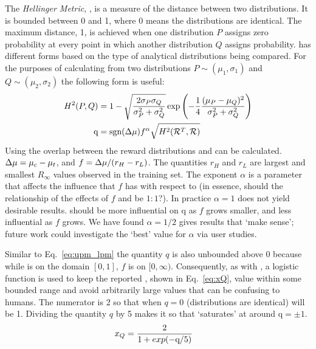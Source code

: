 The \emph{Hellinger Metric}, \hell{},  is a measure of the distance between two distributions. It is bounded between 0 and 1, where 0 means the distributions are identical. The maximum distance, 1, is achieved when one distribution $P$ assigns zero probability at every point in which another distribution $Q$ assigns probability. \hell{} has different forms based on the type of analytical distributions being compared. For the purposes of calculating \xQ{} from two distributions $P \sim (\mu_1,\sigma_1)$ and $Q\sim(\mu_2,\sigma_2)$ the following form is useful:
\begin{align}
    \hellmet &= 1-\sqrt{\frac{2\sigma_P\sigma_Q}{\sigma_P^2+\sigma_Q^2}}\exp{\left(-\frac{1}{4}\frac{(\mu_P-\mu_Q)^2}{\sigma_P^2+\sigma_Q^2}\right)} \\
    \text{q} &= \text{sgn}(\dmu)f^{\alpha}\sqrt{H^{2}(\rwdtrust,\rwd)} \label{eq:q}
\end{align}
Using \hell{} the overlap between the reward distributions \rwdtrustpredict{} and \rwdcandsim{} can be calculated. $\Delta \mu= \mu_c-\mu_t$, and $f = \Delta \mu/(r_H-r_L)$. The quantities $r_H$ and $r_L$ are largest and smallest $R_{\infty}$ values observed in the \surrogate{} training set. The exponent $\alpha$ is a parameter that affects the influence that $f$ has with respect to \hell (in essence, should the relationship of the effects of $f$ and \hell{} be $1:1$?). In practice $\alpha=1$ does not yield desirable results. \hell{} should be more influential on $\text{q}$ as $f$ grows smaller, and less influential as $f$ grows. We have found $\alpha=1/2$ gives results that `make sense'; future work could investigate the `best' value for $\alpha$ via user studies.

Similar to Eq.~\ref{eq:upm_lpm} the quantity $q$ is also unbounded above $0$ because while \hell{} is on the domain $[0,1]$, $f$ is on $[0,\infty)$. Consequently, as with \xO{}, a logistic function is used to keep the reported \xQ{}, shown in Eq.~\ref{eq:xQ}, value within some bounded range and avoid arbitrarily large values that can be confusing to humans. The numerator is 2 so that when $q=0$ (distributions are identical) \xQ{} will be 1. Dividing the quantity $q$ by 5 makes it so that \xQ{} `saturates' at around $\text{q}=\pm1$.
    \begin{align}
        \xQ &= \frac{2}{1+exp(-\text{q}/5)}\label{eq:xQ}
    \end{align}

